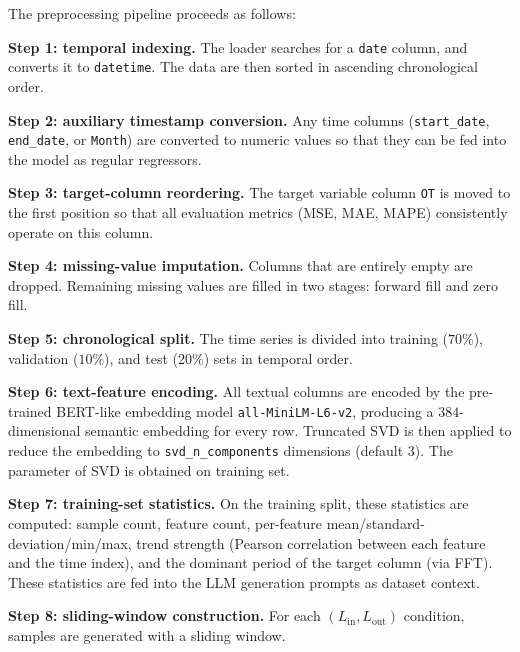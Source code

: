 The preprocessing pipeline proceeds as follows:

\textbf{Step 1: temporal indexing.} The loader searches for a \texttt{date} column, and converts it to \texttt{datetime}. The data are then sorted in ascending chronological order.

\textbf{Step 2: auxiliary timestamp conversion.} Any time columns (\texttt{start\_date}, \texttt{end\_date}, or \texttt{Month}) are converted to numeric values so that they can be fed into the model as regular regressors.

\textbf{Step 3: target-column reordering.} The target variable column \texttt{OT} is moved to the first position so that all evaluation metrics (MSE, MAE, MAPE) consistently operate on this column.

\textbf{Step 4: missing-value imputation.} Columns that are entirely empty are dropped. Remaining missing values are filled in two stages: forward fill and zero fill.

\textbf{Step 5: chronological split.} The time series is divided into training ($70\%$), validation ($10\%$), and test ($20\%$) sets in temporal order.

\textbf{Step 6: text-feature encoding.} All textual columns are encoded by the pre-trained BERT-like embedding model \texttt{all-MiniLM-L6-v2}, producing a $384$-dimensional semantic embedding for every row. Truncated SVD is then applied to reduce the embedding to \texttt{svd\_n\_components} dimensions (default $3$). The parameter of SVD is obtained on training set.

\textbf{Step 7: training-set statistics.} On the training split, these statistics are computed: sample count, feature count, per-feature mean/standard-deviation/min/max, trend strength (Pearson correlation between each feature and the time index), and the dominant period of the target column (via FFT). These statistics are fed into the LLM generation prompts as dataset context.

\textbf{Step 8: sliding-window construction.} For each $(L_{\text{in}}, L_{\text{out}})$ condition, samples are generated with a sliding window.

